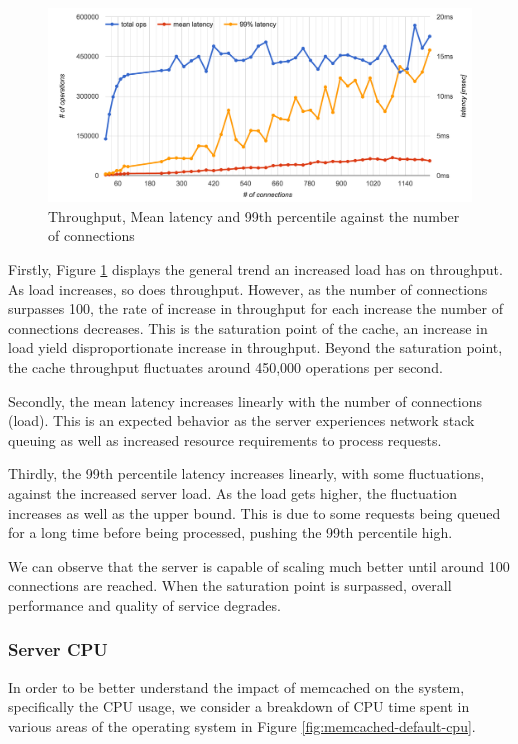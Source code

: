 \begin{figure}[h]
    \includegraphics[width=\textwidth]{./res/5_default_connections.png}
    \caption{Throughput, Mean latency and 99th percentile against the number of connections}
    \label{fig:memcached-default_connections}
\end{figure}

Firstly, Figure \ref{fig:memcached-default_connections} displays the general trend an increased load has on throughput. As load increases, so does throughput. However, as the number of connections surpasses 100, the rate of increase in throughput for each increase the number of connections decreases. This is the saturation point of the cache, an increase in load yield disproportionate increase in throughput. Beyond the saturation point, the cache throughput fluctuates around 450,000 operations per second.

Secondly, the mean latency increases linearly with the number of connections (load). This is an expected behavior as the server experiences network stack queuing as well as increased resource requirements to process requests.

Thirdly, the 99th percentile latency increases linearly, with some fluctuations, against the increased server load. As the load gets higher, the fluctuation increases as well as the upper bound. This is due to some requests being queued for a long time before being processed, pushing the 99th percentile high.

We can observe that the server is capable of scaling much better until around 100 connections are reached. When the saturation point is surpassed, overall performance and quality of service degrades.


\subsubsection{Server CPU}
In order to be better understand the impact of memcached on the system, specifically the CPU usage, we consider a breakdown of CPU time spent in various areas of the operating system in Figure \ref{fig:memcached-default-cpu}.

